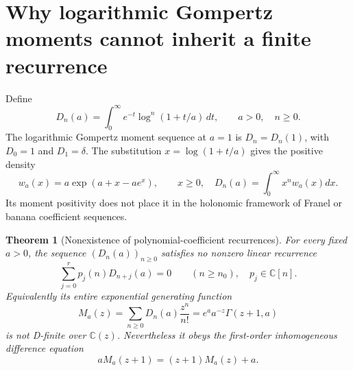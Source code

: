 \documentclass[11pt,a4paper]{article}
\newtheorem{theorem}{Theorem}[section]
\theoremstyle{definition}
\theoremstyle{remark}
\numberwithin{equation}{section}
\begin{document}
\section{Why logarithmic Gompertz moments cannot inherit a finite recurrence}
\label{p3:sec:gompertz-nonholonomic}

Define
\[
 D_n(a)=\int_0^\infty e^{-t}\log^n(1+t/a)\,dt,
 \qquad a>0,\quad n\ge0.
\]
The logarithmic Gompertz moment sequence at $a=1$ is $D_n=D_n(1)$, with $D_0=1$ and
$D_1=\delta$. The substitution $x=\log(1+t/a)$ gives the positive
density
\[
 w_a(x)=a\exp(a+x-ae^x),\qquad x\ge0,
 \quad D_n(a)=\int_0^\infty x^nw_a(x)dx.
\]
Its moment positivity does not place it in the holonomic framework
of Franel or banana coefficient sequences.

\begin{theorem}[Nonexistence of polynomial-coefficient recurrences]
\label{p3:thm:gompertz-not-precursive}
For every fixed $a>0$, the sequence $(D_n(a))_{n\ge0}$ satisfies
no nonzero linear recurrence
\[
 \sum_{j=0}^r p_j(n)D_{n+j}(a)=0\qquad(n\ge n_0),
 \quad p_j\in\mathbb C[n].
\]
Equivalently its entire exponential generating function
\[
 M_a(z)=\sum_{n\ge0}D_n(a)\frac{z^n}{n!}
       =e^a a^{-z}\Gamma(z+1,a)
\]
is not D-finite over $\mathbb C(z)$. Nevertheless it obeys the
first-order inhomogeneous difference equation
\[
 aM_a(z+1)=(z+1)M_a(z)+a.
\]
\end{theorem}
\end{document}
